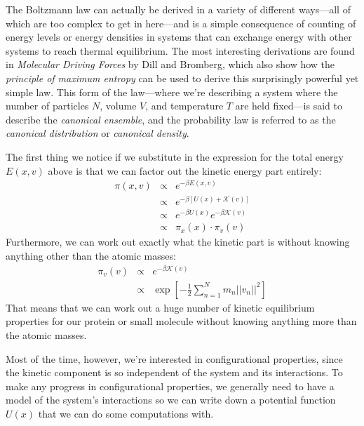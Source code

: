 \documentclass[english,course]{lecture}
\begin{document}
The Boltzmann law can actually be derived in a variety of different ways---all of which are too complex to get in here---and is a simple consequence of counting of energy levels or energy densities in systems that can exchange energy with other systems to reach thermal equilibrium.
The most interesting derivations are found in \emph{Molecular Driving Forces} by Dill and Bromberg, which also show how the \emph{principle of maximum entropy} can be used to derive this surprisingly powerful yet simple law.
This form of the law---where we're describing a system where the number of particles $N$, volume $V$, and temperature $T$ are held fixed---is said to describe the \emph{canonical ensemble}, and the probability law is referred to as the \emph{canonical distribution} or \emph{canonical density}.

The first thing we notice if we substitute in the expression for the total energy $E(x,v)$ above is that we can factor out the kinetic energy part entirely:
\begin{eqnarray}
\pi(x,v) &\propto& e^{-\beta E(x,v)} \\
&\propto& e^{-\beta [U(x) + \mathcal{K}(v)]} \\
&\propto& e^{-\beta U(x)} e^{-\beta \mathcal{K}(v)} \\
&\propto& \pi_x(x) \cdot \pi_v(v)
\end{eqnarray}
Furthermore, we can work out exactly what the kinetic part is without knowing anything other than the atomic masses:
\begin{eqnarray}
\pi_v(v) &\propto& e^{-\beta \mathcal{K}(v)} \\
&\propto& \exp\left[-\frac{1}{2} \sum_{n=1}^N m_n ||v_n||^2 \right]
\end{eqnarray}
That means that we can work out a huge number of kinetic equilibrium properties for our protein or small molecule without knowing anything more than the atomic masses.

Most of the time, however, we're interested in configurational properties, since the kinetic component is so independent of the system and its interactions.
To make any progress in configurational properties, we generally need to have a model of the system's interactions so we can write down a potential function $U(x)$ that we can do some computations with.
\end{document}
